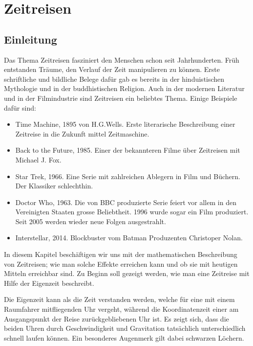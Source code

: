 \chapter{Zeitreisen\label{chapter:zeitreisen}}
\begin{refsection}
\section{Einleitung}
	Das Thema Zeitreisen fasziniert den Menschen schon seit Jahrhunderten. Früh entstanden Träume, den Verlauf der Zeit manipulieren zu können. Erste schriftliche und bildliche Belege dafür gab es bereits in der hinduistischen Mythologie und in der buddhistischen Religion. Auch in der modernen Literatur und in der Filmindustrie sind Zeitreisen ein beliebtes Thema. Einige Beispiele daf\"ur sind: 
\begin{itemize}
    \item Time Machine, 1895 von H.G.Wells. Erste literarische Beschreibung einer Zeitreise in die Zukunft mittel Zeitmaschine.
    \item Back to the Future, 1985. Einer der bekannteren Filme über Zeitreisen mit Michael J. Fox.
    \item Star Trek, 1966. Eine Serie mit zahlreichen Ablegern in Film und Büchern. Der Klassiker schlechthin. 
    \item Doctor Who, 1963. Die von BBC produzierte Serie feiert vor allem in den Vereinigten Staaten grosse Beliebtheit. 1996 wurde sogar ein Film produziert. Seit 2005 werden wieder neue Folgen ausgestrahlt.
    \item Interstellar, 2014. Blockbuster vom Batman Produzenten Christoper Nolan.
\end{itemize}

In diesem Kapitel beschäftigen wir uns mit der mathematischen Beschreibung von Zeitreisen; wie man solche Effekte erreichen kann und ob sie mit heutigen Mitteln erreichbar sind. Zu Beginn soll gezeigt werden, wie man eine Zeitreise mit Hilfe der Eigenzeit beschreibt.

Die Eigenzeit kann als die Zeit verstanden werden, welche für eine mit einem Raumfahrer mitfliegenden Uhr vergeht, während die Koordinatenzeit einer am Ausgangspunkt der Reise zurückgebliebenen Uhr ist.
Es zeigt sich, dass die beiden Uhren durch Geschwindigkeit und Gravitation tatsächlich unterschiedlich schnell laufen können. Ein besonderes Augenmerk gilt dabei schwarzen Löchern. 


\end{refsection}
